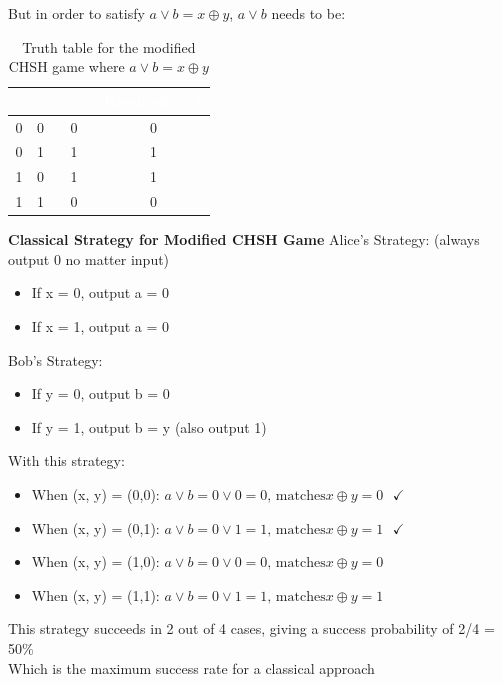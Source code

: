 \documentclass[12pt]{article}
\begin{document}
But in order to satisfy $a \vee b = x \oplus y$, $a \vee b$ needs to be:
\begin{table}[htbp]
    \centering
    \begin{tabular}{|c|c|c|c|}
        \hline
        \rowcolor[HTML]{333333} 
        \textcolor{white}{$x$} & \textcolor{white}{$y$} & \textcolor{white}{$x \oplus y$} & \textcolor{white}{Required $a \vee b$} \\
        \hline
        0 & 0 & 0 & 0 \\
        \hline
        0 & 1 & 1 & 1 \\
        \hline
        1 & 0 & 1 & 1 \\
        \hline
        1 & 1 & 0 & 0 \\
        \hline
    \end{tabular}
    \caption{Truth table for the modified CHSH game where $a \vee b = x \oplus y$}
    \label{tab:modified-chsh}
\end{table}

\textbf{Classical Strategy for Modified CHSH Game}
Alice's Strategy: (always output 0 no matter input)
\begin{itemize}
    \item If x = 0, output a = 0
    \item If x = 1, output a = 0
\end{itemize}
Bob's Strategy:
\begin{itemize}
    \item If y = 0, output b = 0
    \item If y = 1, output b = y (also output 1)
\end{itemize}
With this strategy:
\begin{itemize}
    \item When (x, y) = (0,0): $a \vee b = 0 \vee 0 = 0 \text{, matches} x \oplus y = 0 \text{ } \checkmark $
    \item When (x, y) = (0,1): $a \vee b = 0 \vee 1 = 1 \text{, matches} x \oplus y = 1 \text{ } \checkmark $
    \item When (x, y) = (1,0): $a \vee b = 0 \vee 0 = 0 \text{, matches} x \oplus y = 0 \text{ } $ \texttimes
    \item When (x, y) = (1,1): $a \vee b = 0 \vee 1 = 1 \text{, matches} x \oplus y = 1 \text{ } $ \texttimes
\end{itemize}
This strategy succeeds in 2 out of 4 cases, giving a success probability of 2/4 = 50\%
\\
Which is the maximum success rate for a classical approach
\end{document}
